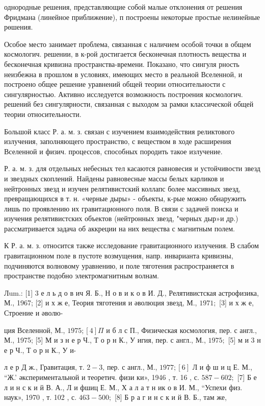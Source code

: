 \documentclass[10pt]{article}
\begin{document}
однородные решения, представляющие собой малые отклонения от решения Фридмана (линейное приближение), п построены некоторые простые нелинейные рөшения.



Особое место занимает проблема, связанная с наличием особой точки в общем космологич. решении, в к-рой достигается бесконечная плотность вещества и бесконечная кривизна пространства-времени. Показано, что сингуля рность неизбежна в прошлом в условиях, имеющих место в реальной Вселенной, и построено общее решение уравнений общей теории относительности с сингулярностью. Активно исследуется возможность построения космологич. решений без сингулярности, связанная с выходом за рамки классической общей теории относительности.



Большой класс Р. а. м. з. связан с изучением взаимодействия реликтового излучения, заполняющего пространство, с веществом в ходе расширения Вселенной и физич. процессов, способных породить такое излучение.



Р. а. м. з. для отдельных небесных тел касаются равновесия и устойчивости звезд и звездных скоплений. Найдены равновесные массы белых карликов и нейтронных звезд и изучен релятивистский коллапс более массивных звезд, превращающихся в т. н. «черные дыры» - объекты, к-рые можно обнаружить лишь по проявлению их гравитационного поля. В связи с задачей поиска и изучения релятивистских объектов (нейтронных звезд, "черных дыр»и др.) рассматривается задача об аккреции на них вещества с магнитным полем.



К Р. а. м. з. относится также исследование гравитационного излучения. В слабом гравитационном поле в пустоте возмущения, напр. инварианта кривизны, подчиняются волновому уравнению, и поле тяготения распространяется в пространстве подобно электромагнитным волнам.



Лum.: [1] 3 е л ь д о в ич Я. Б., Н о в и к о в И. Д., Релятивистская астрофизика, М., 1967; [2] и х ж е, Теория тяготения и әволюция звезд, М., $1971 ;$ [3] и х ж е, Строение и әволю-

ция Вселенной, М., $1975 ;[4] \Pi$ и б л с П., Физическая космология, пер. с англ., М., 1975; [5] М и з н е р Ч., Т о р н К., У игия, пер. с англ., М., $1975 ;$ [5] м и 3 н е р Ч., Т о р н К., У и-

л е р Д ж., Гравитация, т. $2-3$, пер. с англ., М., $1977 ;[6]$ Л и ф ш и ц Е. М., “Ж.' әкспериментальной и теоретич. физи ки», 1946 , т. 16 , с. $587-602 ;$ [7] Б е л и н с к и й В. А., Л и фшиц Е. М., Х а л а т н ик о в И. М., “Успехи физ. наук», 1970 , т. 102 , с. $463-500 ;$ [8] Б р а г и н с к и й В. Б., там же,
\end{document}
